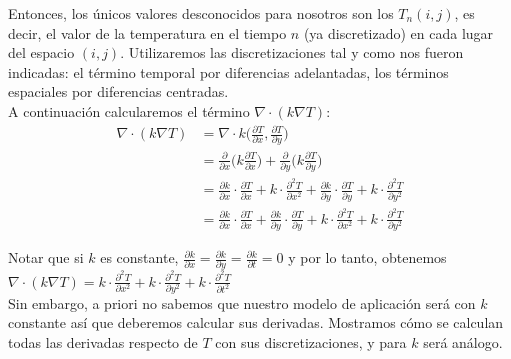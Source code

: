 \documentclass[a4paper]{article}
\begin{document}
Entonces, los únicos valores desconocidos para nosotros son los $T_n(i,j)$, es decir, el valor de la temperatura en el tiempo $n$ (ya discretizado) en cada lugar del espacio $(i,j)$.
Utilizaremos las discretizaciones tal y como nos fueron indicadas: el término temporal por diferencias adelantadas, los términos espaciales por diferencias centradas. \\

A continuación calcularemos el término $\nabla \cdot (k \nabla T)$:
\begin{equation} \label{eq:nablaT}
\begin{split}
\nabla \cdot (k \nabla T) & = \nabla \cdot k \bigg(\frac{\partial T}{\partial x}, \frac{\partial T}{\partial y}\bigg) \\
& = \frac{\partial}{\partial x} \bigg(k \frac{\partial T}{\partial x}\bigg) + \frac{\partial}{\partial y} \bigg(k \frac{\partial T}{\partial y}\bigg) \\
& = \frac{\partial k}{\partial x} \cdot \frac{\partial T}{\partial x} + k \cdot \frac{\partial^2 T}{\partial x^2} + \frac{\partial k}{\partial y} \cdot \frac{\partial T}{\partial y} + k \cdot \frac{\partial^2 T}{\partial y^2} \\
 & = \frac{\partial k}{\partial x} \cdot \frac{\partial T}{\partial x} + \frac{\partial k}{\partial y} \cdot \frac{\partial T}{\partial y} + k \cdot \frac{\partial^2 T}{\partial x^2} + k \cdot \frac{\partial^2 T}{\partial y^2}
\end{split}
\end{equation}

Notar que si $k$ es constante, $\frac{\partial k}{\partial x} = \frac{\partial k}{\partial y} = \frac{\partial k}{\partial t} = 0$ y por lo tanto, obtenemos $\nabla \cdot (k \nabla T) = k \cdot \frac{\partial^2 T}{\partial x^2} + k \cdot \frac{\partial^2 T}{\partial y^2} + k \cdot \frac{\partial^2 T}{\partial t^2}$ \\
Sin embargo, a priori no sabemos que nuestro modelo de aplicación será con $k$ constante así que deberemos calcular sus derivadas. Mostramos cómo se calculan todas las derivadas respecto de $T$ con sus discretizaciones, y para $k$ será análogo.
\end{document}
